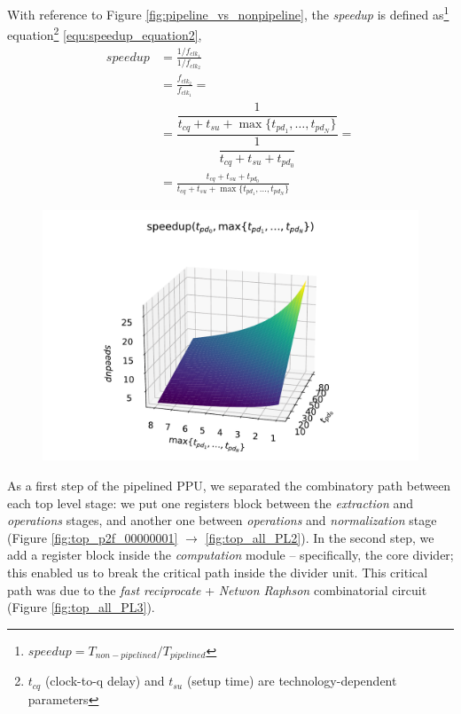 With reference to Figure \ref{fig:pipeline_vs_nonpipeline}, the \textit{speedup} is defined as\footnote{\cite{lilja_pipelining_2004} $speedup = T_{non-pipelined}/T_{pipelined}$} equation\footnote{$t_{cq}$ (clock-to-q delay) and $t_{su}$ (setup time) are technology-dependent parameters} \eqref{equ:speedup_equation2},
        \begin{equation}\label{equ:speedup_equation2}
            \begin{aligned}
                speedup &= \frac{1/f_{clk_1}}{1/f_{clk_2}} \\
                &= \frac{f_{clk_2}}{f_{clk_1}} = \\
                &= \dfrac{\dfrac{1}{t_{cq} + t_{su} + \max\{t_{pd_1}, \dots, t_{pd_N} \}}}{\dfrac{1}{t_{cq} + t_{su} + t_{pd_0}}} = \\
                &= \frac{t_{cq} + t_{su} + t_{pd_0}}{t_{cq} + t_{su} + \max\{t_{pd_1}, \dots, t_{pd_N} \}}
            \end{aligned}
        \end{equation}
        \begin{figure}
            \includegraphics[width=1\textwidth]{figures/3d_plot_speedup.pdf}
            \label{fig:speedupplot}
        \end{figure}


As a first step of the pipelined PPU, we separated the combinatory path between each top level stage: we put one registers block between the \textit{extraction} and \textit{operations} stages, and another one between \textit{operations} and \textit{normalization} stage (Figure \ref{fig:top_p2f_00000001}  $\rightarrow$ \ref{fig:top_all_PL2}).
In the second step, we add a register block inside the \textit{computation} module -- specifically, the core divider; this  enabled us to break the critical path inside the divider unit. This critical path was due to the \textit{fast reciprocate} + \textit{Netwon Raphson} combinatorial circuit (Figure \ref{fig:top_all_PL3}).



